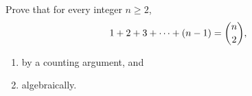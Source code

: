 Prove that for every integer $n\ge2$,
\[
1+2+3+\cdots+(n-1)=\dbinom n2,
\]
\begin{enumerate}
\item[(a)] by a counting argument, and
\item[(b)] algebraically.
\end{enumerate}
